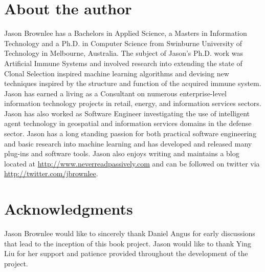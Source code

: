 \section*{About the author}
Jason Brownlee has a Bachelors in Applied Science, a Masters in Information Technology and a Ph.D. in Computer Science from Swinburne University of Technology in Melbourne, Australia. The subject of Jason's Ph.D. work was Artificial Immune Systems and involved research into extending the state of Clonal Selection inspired machine learning algorithms and devising new techniques inspired by the structure and function of the acquired immune system.
Jason has earned a living as a Consultant on numerous enterprise-level information technology projects in retail, energy, and information services sectors. Jason has also worked as Software Engineer investigating the use of intelligent agent technology in geospatial and information services domains in the defense sector.
Jason has a long standing passion for both practical software engineering and basic research into machine learning and has developed and released many plug-ins and software tools. Jason also enjoys writing and maintains a blog located at \url{http://www.neverreadpassively.com} and can be followed on twitter via \url{http://twitter.com/jbrownlee}. 

% 
% 
\section*{Acknowledgments}
Jason Brownlee would like to sincerely thank Daniel Angus for early discussions that lead to the inception of this book project.
Jason would like to thank Ying Liu for her support and patience provided throughout the development of the project. 